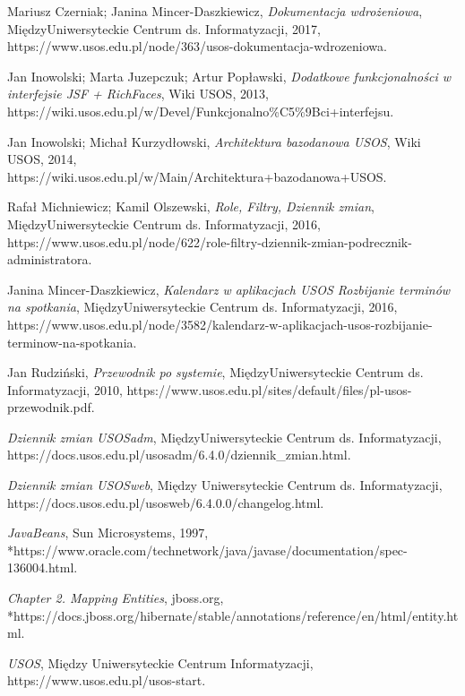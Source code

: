\documentclass[licencjacka]{pracamgr}
\begin{document}
\begin{thebibliography}{99}


 Mariusz Czerniak; Janina Mincer-Daszkiewicz, \textit{Dokumentacja wdrożeniowa}, MiędzyUniwersyteckie Centrum ds. Informatyzacji, 2017, https://www.usos.edu.pl/node/363/usos-dokumentacja-wdrozeniowa.

 Jan Inowolski; Marta Juzepczuk; Artur Popławski, \textit{Dodatkowe funkcjonalności w interfejsie JSF + RichFaces}, Wiki USOS, 2013, https://wiki.usos.edu.pl/w/Devel/Funkcjonalno\%C5\%9Bci+interfejsu.
 	
 Jan Inowolski; Michał Kurzydłowski, \textit{Architektura bazodanowa USOS}, Wiki USOS, 2014, https://wiki.usos.edu.pl/w/Main/Architektura+bazodanowa+USOS.

 Rafał Michniewicz; Kamil Olszewski, \textit{Role, Filtry, Dziennik zmian}, MiędzyUniwersyteckie Centrum ds. Informatyzacji, 2016, https://www.usos.edu.pl/node/622/role-filtry-dziennik-zmian-podrecznik-administratora.

 Janina Mincer-Daszkiewicz, \textit{Kalendarz w aplikacjach USOS Rozbijanie terminów na spotkania}, MiędzyUniwersyteckie Centrum ds. Informatyzacji, 2016, https://www.usos.edu.pl/node/3582/kalendarz-w-aplikacjach-usos-rozbijanie-terminow-na-spotkania.

 Jan Rudziński, \textit{Przewodnik po systemie}, MiędzyUniwersyteckie Centrum ds. Informatyzacji, 2010, https://www.usos.edu.pl/sites/default/files/pl-usos-przewodnik.pdf.

 \textit{Dziennik zmian USOSadm}, MiędzyUniwersyteckie Centrum ds. Informatyzacji, https://docs.usos.edu.pl/usosadm/6.4.0/dziennik\_zmian.html.

 \textit{Dziennik zmian USOSweb}, Między Uniwersyteckie Centrum ds. Informatyzacji, https://docs.usos.edu.pl/usosweb/6.4.0.0/changelog.html.

 \textit{JavaBeans}, Sun Microsystems, 1997,\\*https://www.oracle.com/technetwork/java/javase/documentation/spec-136004.html.

 \textit{Chapter 2. Mapping Entities}, jboss.org,\\*https://docs.jboss.org/hibernate/stable/annotations/reference/en/html/entity.html.

 \textit{USOS}, Między Uniwersyteckie Centrum Informatyzacji, https://www.usos.edu.pl/usos-start.

\end{thebibliography}
\end{document}
